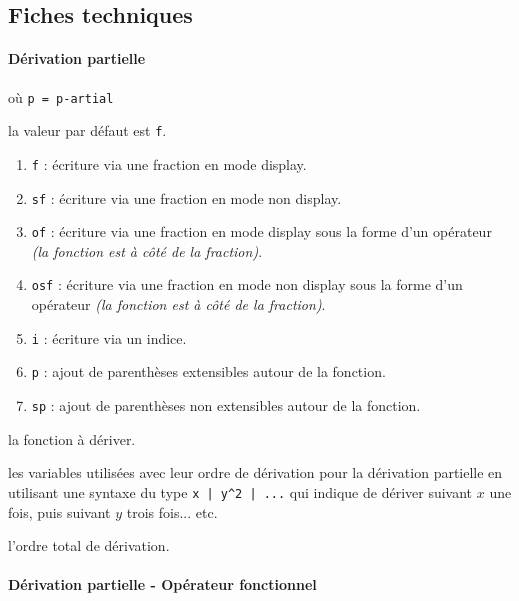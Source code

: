 \documentclass[12pt,a4paper]{article}
\theoremstyle{definition}
\newcommand\mwhyprefix[2]{%
	\texttt{#1 = #1-#2}%
}
\begin{document}


\subsection{Fiches techniques}

\paragraph{Dérivation partielle}

 où \quad \mwhyprefix{p}{artial}

\IDoption{} la valeur par défaut est \verb+f+. 
\begin{enumerate}
	\item \verb+f+ : écriture via une fraction en mode display.

	\item \verb+sf+ : écriture via une fraction en mode non display.

	\item \verb+of+ : écriture via une fraction en mode display sous la forme d'un opérateur \emph{(la fonction est à côté de la fraction)}.

	\item \verb+osf+ : écriture via une fraction en mode non display sous la forme d'un opérateur \emph{(la fonction est à côté de la fraction)}.

	\item \verb+i+ : écriture via un indice.

	\smallskip
	\item \verb+p+ : ajout de parenthèses extensibles autour de la fonction.

	\item \verb+sp+ : ajout de parenthèses non extensibles autour de la fonction.
\end{enumerate}


 la fonction à dériver.

 les variables utilisées avec leur ordre de dérivation pour la dérivation partielle en utilisant une syntaxe du type \verb+x | y^2 | ...+ qui indique de dériver suivant $x$ une fois, puis suivant $y$ trois fois... etc.

 l'ordre total de dérivation.




\paragraph{Dérivation partielle - Opérateur fonctionnel}
\end{document}
